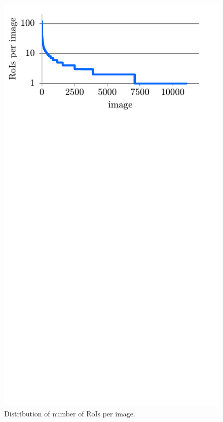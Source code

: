 \documentclass[a4paper,twoside]{article}
\begin{document}
%
\begin{figure}%
\centering%
\includegraphics[width=\linewidth, trim=0cm 11cm 0cm 0cm, clip]{img/logoDistribution.pdf}%
\caption{Distribution of number of RoIs per image.}%
\label{fig:logoDistribution}
\end{figure}%
%
\end{document}
